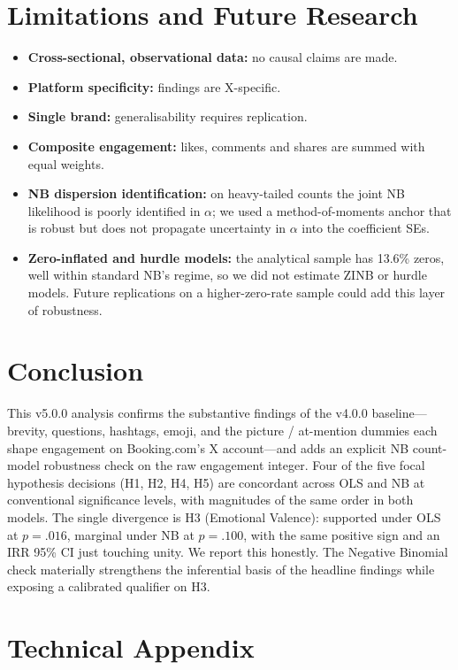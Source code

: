 \documentclass[12pt,a4paper]{article}
\begin{document}
\section{Limitations and Future Research}

\begin{itemize}
    \item \textbf{Cross-sectional, observational data:} no causal claims are made.
    \item \textbf{Platform specificity:} findings are X-specific.
    \item \textbf{Single brand:} generalisability requires replication.
    \item \textbf{Composite engagement:} likes, comments and shares are summed with equal weights.
    \item \textbf{NB dispersion identification:} on heavy-tailed counts the joint NB likelihood is poorly identified in $\alpha$; we used a method-of-moments anchor that is robust but does not propagate uncertainty in $\alpha$ into the coefficient SEs.
    \item \textbf{Zero-inflated and hurdle models:} the analytical sample has 13.6\% zeros, well within standard NB's regime, so we did not estimate ZINB or hurdle models. Future replications on a higher-zero-rate sample could add this layer of robustness.
\end{itemize}

\section{Conclusion}

This v5.0.0 analysis confirms the substantive findings of the v4.0.0 baseline---brevity, questions, hashtags, emoji, and the picture / at-mention dummies each shape engagement on Booking.com's X account---and adds an explicit NB count-model robustness check on the raw engagement integer. Four of the five focal hypothesis decisions (H1, H2, H4, H5) are concordant across OLS and NB at conventional significance levels, with magnitudes of the same order in both models. The single divergence is H3 (Emotional Valence): supported under OLS at $p=.016$, marginal under NB at $p=.100$, with the same positive sign and an IRR 95\% CI just touching unity. We report this honestly. The Negative Binomial check materially strengthens the inferential basis of the headline findings while exposing a calibrated qualifier on H3.

\appendix
\section{Technical Appendix}
\end{document}
